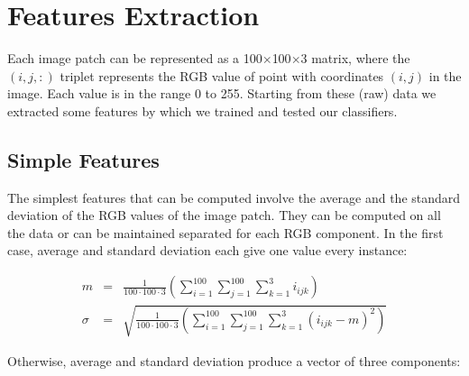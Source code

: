 \vspace{0.5cm}




\section{Features Extraction}
\label{ch4:FE}

Each image patch can be represented as a 100$\times$100$\times$3 matrix, where the $(i,j,:)$ triplet represents the RGB value of point with coordinates $(i,j)$ in the image.
Each value is in the range 0 to 255. Starting from these (raw) data we extracted some features by which we trained and tested our classifiers.

\vspace{0.5cm}

\subsection{Simple Features}
\label{ch4:sf}

The simplest features that can be computed involve the average and the standard deviation of the \Gls{RGB} values of the image patch. They can be computed on all the data or can be maintained separated
for each \Gls{RGB} component. In the first case, average and standard deviation each give one value every instance:

\begin{eqnarray}
 m & = & \frac{1}{100\cdot100\cdot3} \left( \sum_{i=1}^{100} \sum_{j=1}^{100} \sum_{k=1}^{3} i_{ijk} \right) \\
 \sigma & = & \sqrt{\frac{1}{100\cdot100\cdot3} \left( \sum_{i=1}^{100} \sum_{j=1}^{100} \sum_{k=1}^{3} (i_{ijk} - m )^2 \right)}
\end{eqnarray}

Otherwise, average and standard deviation produce a vector of three components:

